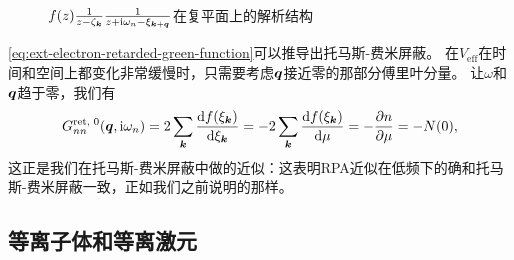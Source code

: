\begin{figure}
    \centering
    
    \caption{$f(z) \frac{1}{z - \zeta_{\vb*{k}}} \frac{1}{z + \mathrm{i} \omega_n - \xi_{\vb*{k} + \vb*{q}}}$在复平面上的解析结构}
    \label{fig:rpa-pole}
\end{figure}

\eqref{eq:ext-electron-retarded-green-function}可以推导出托马斯-费米屏蔽。
在$V_\text{eff}$在时间和空间上都变化非常缓慢时，只需要考虑$\vb*{q}$接近零的那部分傅里叶分量。
让$\omega$和$\vb*{q}$趋于零，我们有
\[
    G_{nn}^\text{ret, 0}(\vb*{q}, \mathrm{i} \omega_n) = 2 \sum_{\vb*{k}} \dv{f(\xi_{\vb*{k}})}{\xi_{\vb*{k}}} = - 2 \sum_{\vb*{k}} \dv{f(\xi_{\vb*{k}})}{\mu} = - \pdv{n}{\mu} = - N(0),
\]
这正是我们在托马斯-费米屏蔽中做的近似：这表明RPA近似在低频下的确和托马斯-费米屏蔽一致，正如我们之前说明的那样。

\subsection{等离子体和等离激元}

